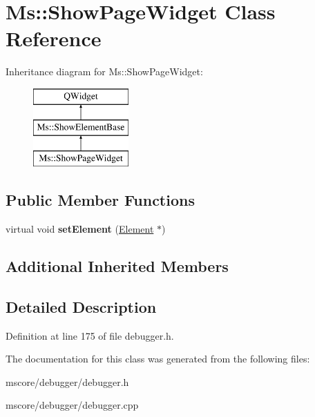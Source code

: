 \hypertarget{class_ms_1_1_show_page_widget}{}\section{Ms\+:\+:Show\+Page\+Widget Class Reference}
\label{class_ms_1_1_show_page_widget}
Inheritance diagram for Ms\+:\+:Show\+Page\+Widget\+:\begin{figure}[H]
\begin{center}
\leavevmode
\includegraphics[height=3.000000cm]{class_ms_1_1_show_page_widget}
\end{center}
\end{figure}
\subsection*{Public Member Functions}
\begin{DoxyCompactItemize}
\item 
\mbox{\label{class_ms_1_1_show_page_widget_a982db2192e39a18a253041ceaee4e116}} 
virtual void {\bfseries set\+Element} (\hyperlink{class_ms_1_1_element}{Element} $\ast$)
\end{DoxyCompactItemize}
\subsection*{Additional Inherited Members}


\subsection{Detailed Description}


Definition at line 175 of file debugger.\+h.



The documentation for this class was generated from the following files\+:\begin{DoxyCompactItemize}
\item 
mscore/debugger/debugger.\+h\item 
mscore/debugger/debugger.\+cpp\end{DoxyCompactItemize}
